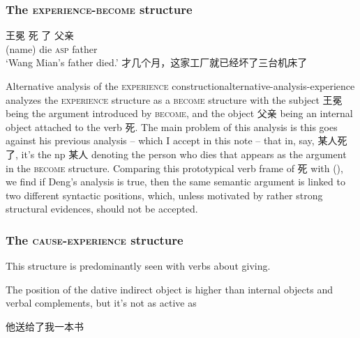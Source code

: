 \documentclass[UTF8, a4paper, oneside, scheme=plain]{ctexrep}
\newcommand*{\citesec}[1]{\S~{#1}}
\newcommand{\translate}[1]{`#1'}
\newcommand*{\category}[1]{\textsc{#1}}
\begin{document}
\subsubsection{The \category{experience}-\category{become} structure}\label{sec:verb-phrase.experience}

\begin{exe}
    \ex\label{ex:verb-phrase.experience.1} \gll 王冕 死 了 父亲 \\
    (name) die \category{asp} father \\
    \glt \translate{Wang Mian's father died.}
    \ex 才几个月，这家工厂就已经坏了三台机床了
\end{exe}

\begin{infobox}{Alternative analysis of the \category{experience} construction}{alternative-analysis-experience}
    \citet[\citesec{212}]{deng2010formal} analyzes the \category{experience} structure 
    as a \category{become} structure with 
    the subject 王冕 being the argument introduced by \category{become},
    and the object 父亲 being an internal object attached to the verb 死.
    The main problem of this analysis is 
    this goes against his previous analysis -- 
    which I accept in this note -- 
    that in, say, 某人死了, it's the \acs{np} 某人 denoting the person who dies that 
    appears as the argument in the \category{become} structure.
    Comparing this prototypical verb frame of 死 
    with (),
    we find if Deng's analysis is true,
    then the same semantic argument is linked to two different syntactic positions,
    which, unless motivated by rather strong structural evidences, 
    should not be accepted.
\end{infobox}

\subsubsection{The \category{cause}-\category{experience} structure}

This structure is predominantly seen with verbs about giving.

The position of the dative indirect object is higher than internal objects and verbal complements, 
but it's not as active as 


\begin{exe}
    \ex\label{ex:verb-phrase.cause.experience.1} 他送给了我一本书
\end{exe}
\end{document}
